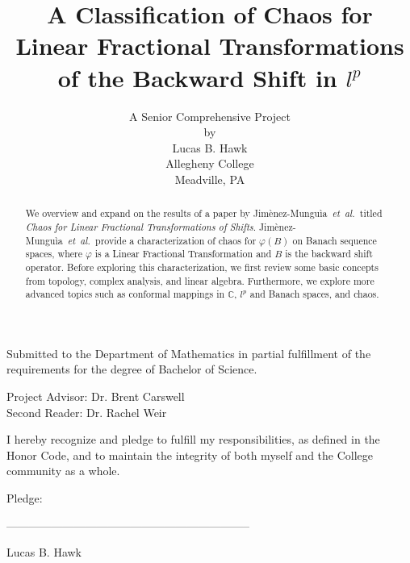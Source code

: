 \documentclass[11pt]{article}
\title{\bf{A Classification of Chaos for Linear Fractional Transformations of the Backward Shift in $l^p$}}
\theoremstyle{plain}
\theoremstyle{definition}
\newcommand{\etal}{\mbox{\emph{et al.\ }}}
\newcommand{\authors}{Jim{\`e}nez-Mungu{\`i}a\ }
\begin{document}
\author {A Senior Comprehensive Project \\
by\\
Lucas B. Hawk \\
Allegheny College\\
Meadville, PA}

\maketitle
\thispagestyle{empty}
\begin{center}
Submitted to the Department of Mathematics in partial fulfillment of the requirements for the degree of Bachelor of Science.
\end{center}

\vspace{0.5 in}
\begin{center}
Project Advisor:  Dr. Brent Carswell \\
Second Reader: Dr. Rachel Weir
\end{center}

\vspace{0.5 in}
\begin{center}
I hereby recognize and pledge to fulfill my responsibilities, as defined in the Honor Code, and to maintain the integrity of both myself and the College community as a whole.
\end{center}

\vspace{0.25 in}
\begin{center}
Pledge:

\vspace{0.5 in}
-----------------------------------------------------------------

\vspace{0.00 in}
Lucas B. Hawk
\end{center}

\doublespacing
\newpage

\thispagestyle{empty}

\begin{abstract}
We overview and expand on the results of a paper by  \authors \etal titled \textit{Chaos for Linear Fractional Transformations of Shifts}.  \authors \etal provide a characterization of chaos for $\varphi(B)$ on Banach sequence spaces, where $\varphi$ is a Linear Fractional Transformation and $B$ is the backward shift operator.  Before exploring this characterization, we first review some basic concepts from topology, complex analysis, and linear algebra.  Furthermore, we explore more advanced topics such as conformal mappings in $\mathbb{C}$, $l^p$ and Banach spaces, and chaos.
\end{abstract}
\newpage
\thispagestyle{empty}
\tableofcontents
\end{document}
